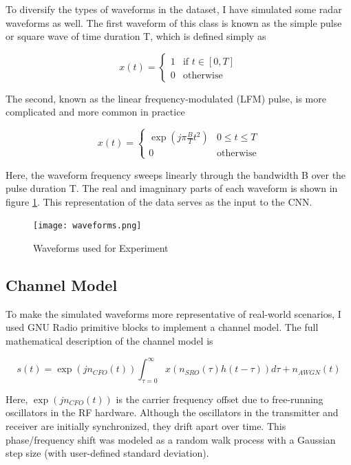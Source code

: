 \documentclass{article}
\begin{document}
To diversify the types of waveforms in the dataset, I have simulated
some radar waveforms as well. The first waveform of this class is known as the
simple pulse or square wave of time duration T, which is defined simply as 

\begin{equation}
    x(t) = \begin{cases}
        1 & \text{if } t \in [0,T] \\
        0 & \text{otherwise}
    \end{cases}
    \label{eq:square}
\end{equation}

The second, known as the linear frequency-modulated (LFM) pulse, is more
complicated and more common in practice

\begin{equation}
    x(t) = \begin{cases}
        \exp\left(j\pi \frac{B}{T}t^2\right) & 0 \leq t \leq T \\
        0 & \text{otherwise}
    \end{cases}
    \label{eq:lfm}
\end{equation}

Here, the waveform frequency sweeps linearly through the bandwidth B over the
pulse duration T. The real and imagninary parts of each
waveform is shown in figure \ref{fig:waveforms}. This representation of the data
serves as the input to the CNN.

\begin{figure}[H]
    \centering
    \texttt{[image: waveforms.png]}
    \caption{Waveforms used for Experiment}
    \label{fig:waveforms}
\end{figure}

\subsection{Channel Model}
To make the simulated waveforms more representative of real-world scenarios, I
used GNU Radio primitive blocks to implement a channel model. The full mathematical
description of the channel model is

\begin{equation}
    s(t) = \exp(jn_{CFO}(t))\int_{\tau=0}^\infty x(n_{SRO}(\tau)h(t-\tau))d\tau + n_{AWGN}(t)
\end{equation}

Here, $\exp(jn_{CFO}(t))$ is the carrier frequency offset due to free-running
oscillators in the RF hardware. Although the oscillators in the transmitter and
receiver are initially synchronized, they drift apart over time. This
phase/frequency shift was modeled as a random walk process with a Gaussian step
size (with user-defined standard deviation).
\end{document}
